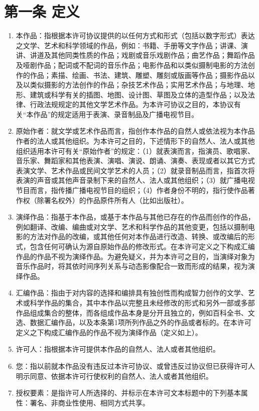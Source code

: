 \section{第一条 定义} 
\begin{enumerate}
	\item 本作品：指根据本许可协议提供的以任何方式和形式（包括以数字形式）表达之文学、艺术和科学领域的作品，例如：书籍、手册等文字作品；讲课、演讲、讲道及其他同类性质的作品；戏剧或音乐戏剧作品；曲艺作品；舞蹈作品及哑剧作品；配词或不配词的音乐作品；电影作品和以类似摄制电影的方法创作的作品；素描、绘画、书法、建筑、雕塑、雕刻或版画等作品；摄影作品以及以类似摄影的方法创作的作品；杂技艺术作品；实用艺术作品；与地理、地形、建筑或科学有关的插图、地图、设计图、草图及立体的造型作品；以及法律、行政法规规定的其他文学艺术作品。为本许可协议之目的，本协议有关“本作品”的规定适用于表演、录音制品及广播电视节目。 
	\item 原始作者：就文学或艺术作品而言，指创作本作品的自然人或依法视为本作品作者的法人或其他组织。为本许可之目的，下述情形下的自然人、法人或其他组织适用本许可有关“原始作者”的规定：（1）就表演而言，指演员、歌唱家、音乐家、舞蹈家和其他表演、演唱、演说、朗诵、演奏、表现或者以其它方式表演文学、艺术作品或民间文学艺术的人员；（2）就录音制品而言，指首次将表演的声音或其他声音录制下来的自然人、法人或其他组织；（3）就广播电视节目而言，指传播广播电视节目的组织；（4）作者身份不明的，指行使作品著作权（除署名权外）的作品原件所有人（比如出版社）。
	\item 演绎作品：指基于本作品，或基于本作品与其他已存在的作品而创作的作品，例如翻译、改编、编曲或对文学、艺术和科学作品的其他变更，包括以摄制电影的方法对作品的改编，或其他任何对本作品进行改造、转换、或改编后的形式，包含任何可确认为源自原始作品的修改形式。在本许可定义之下构成汇编作品的作品不视为演绎作品。为避免疑义，并为本许可之目的，当演绎对象为音乐作品时，将其依时间序列关系与动态影像配合一致而形成的结果，视为演绎作品。
	\item 汇编作品：指由于对内容的选择和编排具有独创性而构成智力创作的文学、艺术或科学作品的集合，其中本作品以完整且未经修改的形式和另外一部或多部作品组成集合的整体，而各组成作品本身是分开且独立的，例如百科全书、文选、数据汇编作品，以及本条第1项所列作品之外的作品或者标的。在本许可定义之下构成汇编作品的作品不视为演绎作品（定义如上）。
	\item 许可人：指根据本许可提供本作品的自然人、法人或者其他组织。
	\item 您：指以前就本作品没有违反过本许可协议、或曾违反过协议但已获得许可人明示同意、依据本许可行使权利的自然人、法人或者其他组织。
	\item 授权要素：是指许可人所选择的、并标示在本许可文本标题中的下列基本属性：署名、非商业性使用、相同方式共享。

\end{enumerate}
